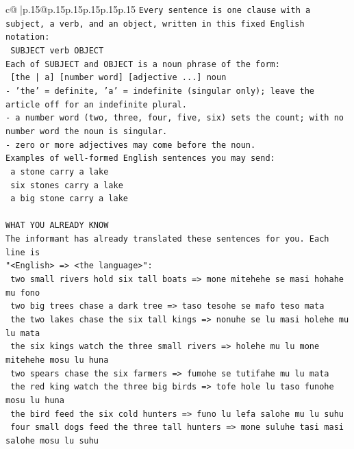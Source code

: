 \documentclass{article}
\begin{document}
{\begin{supertabular}{c@{$\;$}|p{.15\linewidth}@{}p{.15\linewidth}p{.15\linewidth}p{.15\linewidth}p{.15\linewidth}p{.15\linewidth}}
{{{\texttt{Every sentence is one clause with a subject, a verb, and an object, written in this fixed English notation:} \\
\texttt{    SUBJECT  verb  OBJECT} \\
\texttt{Each of SUBJECT and OBJECT is a noun phrase of the form:} \\
\texttt{    {[}the | a{]}  {[}number word{]}  {[}adjective ...{]}  noun} \\
\texttt{{-} 'the' = definite, 'a' = indefinite (singular only); leave the article off for an indefinite plural.} \\
\texttt{{-} a number word (two, three, four, five, six) sets the count; with no number word the noun is singular.} \\
\texttt{{-} zero or more adjectives may come before the noun.} \\
\texttt{Examples of well{-}formed English sentences you may send:} \\
\texttt{    a stone carry a lake} \\
\texttt{    six stones carry a lake} \\
\texttt{    a big stone carry a lake} \\
\\ 
\texttt{WHAT YOU ALREADY KNOW} \\
\texttt{The informant has already translated these sentences for you. Each line is} \\
\texttt{"<English>  =>  <the language>":} \\
\texttt{    two small rivers hold six tall boats  =>  mone mitehehe se masi hohahe mu fono} \\
\texttt{    two big trees chase a dark tree  =>  taso tesohe se mafo teso mata} \\
\texttt{    the two lakes chase the six tall kings  =>  nonuhe se lu masi holehe mu lu mata} \\
\texttt{    the six kings watch the three small rivers  =>  holehe mu lu mone mitehehe mosu lu huna} \\
\texttt{    two spears chase the six farmers  =>  fumohe se tutifahe mu lu mata} \\
\texttt{    the red king watch the three big birds  =>  tofe hole lu taso funohe mosu lu huna} \\
\texttt{    the bird feed the six cold hunters  =>  funo lu lefa salohe mu lu suhu} \\
\texttt{    four small dogs feed the three tall hunters  =>  mone suluhe tasi masi salohe mosu lu suhu} \\
}}}
\end{supertabular}}
\end{document}
